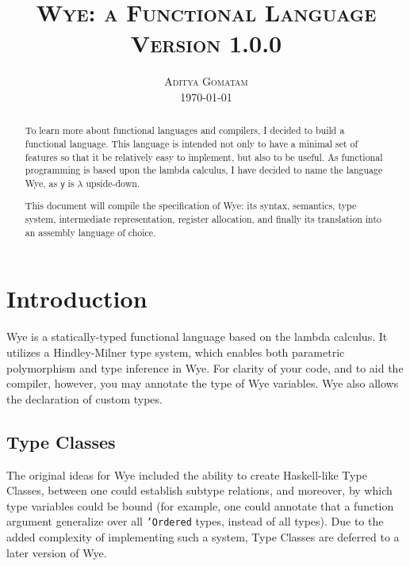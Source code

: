 \documentclass[a4paper, 12pt]{article}
\newcommand{\version}{1.0.0}
\begin{document}
\title{
\textsc{Wye: a Functional Language} \\
\vspace{2ex}
\large{\textsc{Version \version}}\\
\vspace{2ex}}

\author{\normalsize\textsc{Aditya Gomatam} \\ 
\normalsize{\today\vspace{2ex}}}
\date{}
\maketitle


\begin{abstract}
To learn more about functional languages and compilers, I decided to build a functional language. This language is intended not only to have a minimal set of features so that it be relatively easy to implement, but also to be useful. As functional programming is based upon the lambda calculus, I have decided to name the language Wye, as $\mathsf{y}$ is $\lambda$ upside-down.

This document will compile the specification of Wye: its syntax, semantics, type system, intermediate representation, register allocation, and finally its translation into an assembly language of choice.
\end{abstract}

\section{Introduction}
Wye is a statically-typed functional language based on the lambda calculus. It utilizes a Hindley-Milner type system, which enables both parametric polymorphism and type inference in Wye. For clarity of your code, and to aid the compiler, however, you may annotate the type of Wye variables. Wye also allows the declaration of custom types.

\subsection{Type Classes}
The original ideas for Wye included the ability to create Haskell-like Type Classes, between one could establish subtype relations, and moreover, by which type variables could be bound (for example, one could annotate that a function argument generalize over all \texttt{'Ordered} types, instead of all types). Due to the added complexity of implementing such a system, Type Classes are deferred to a later version of Wye.
\end{document}
